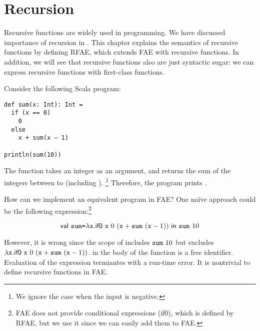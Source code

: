 
\chapter{Recursion}

\renewcommand{\plang}{\textsf{FAE}\xspace}
\renewcommand{\Lang}{\textsf{RFAE}\xspace}

\newcommand{\sumbody}{\eifz{\cx}{0}{(\eadd{\cx}{\eapp{\code{sum}}{(\esub{\cx}{1})}})}}
\newcommand{\sumbodyf}{\eifz{\cx}{0}{(\eadd{\cx}{\eapp{\code{f}}{(\esub{\cx}{1})}})}}
\newcommand{\sumbodyfv}{\eifz{\cv}{0}{(\eadd{\cv}{\eapp{\code{f}}{(\esub{\cv}{1})}})}}

Recursive functions are widely used in programming. We have discussed importance of
recursion in . This chapter explains the semantics of
recursive functions by defining \Lang, which extends \plang with recursive
functions. In addition, we will see that recursive functions also are just syntactic
sugar: we can express recursive functions with first-class functions.

Consider the following Scala program:

\begin{verbatim}
def sum(x: Int): Int =
  if (x == 0)
    0
  else
    x + sum(x – 1)

println(sum(10))
\end{verbatim}

The function  takes an integer  as an argument, and returns
the sum of the integers between  to  (including ).
\footnote{We ignore the case when the input is negative.}
Therefore, the program prints .

How can we implement an equivalent program in \plang? One naïve approach could
be the following expression:\footnote{\plang does not provide conditional
expressions (\textsf{if0}), which is defined by \Lang, but we use it since
we can easily add them to \plang.}

\[\textsf{val}\ 
  \texttt{sum}
\texttt{=}
  \lambda\texttt{x}.\textsf{if0}\ \texttt{x}\ 0\ (\texttt{x}+\texttt{sum}\ (\texttt{x}-1))
\ \textsf{in}\ 
  \texttt{sum}\ 10
\]

However, it is wrong since the scope of  includes $\texttt{sum}\ 10$ but excludes
$\lambda\texttt{x}.\textsf{if0}\ \texttt{x}\ 0\ (\texttt{x}+\texttt{sum}\ (\texttt{x}-1))$.
 in the body of the function is a free identifier. Evaluation of the
expression termiantes with a run-time error. It is nontrivial to define recursive
functions in \plang.

